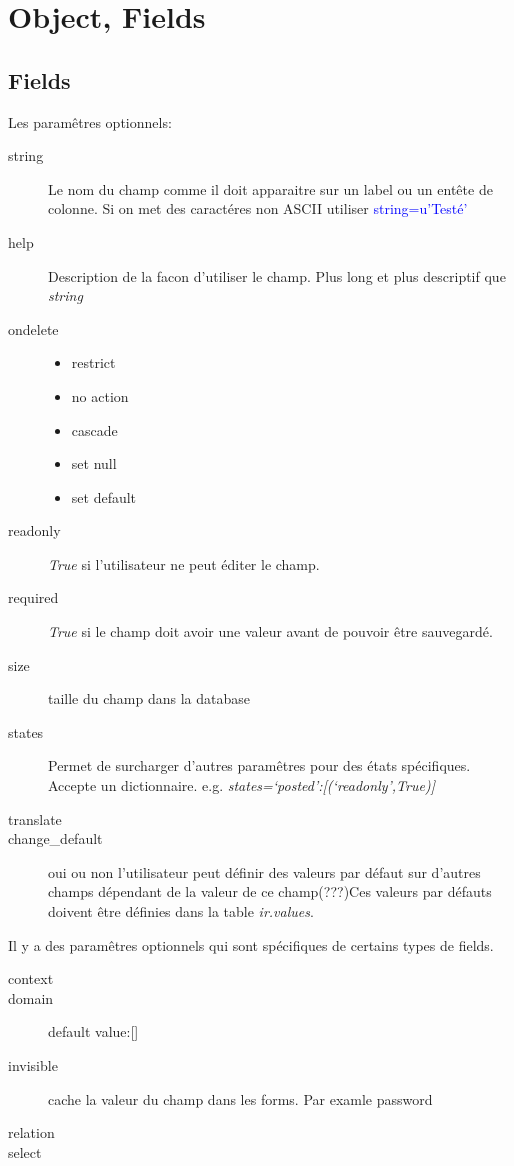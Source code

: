 \documentclass[12pt,a4paper]{article}
\begin{document}
\section{Object, Fields}
\label{sec:obj,field}

\subsection{Fields}
\label{sec:fields}

Les paramêtres optionnels:
\begin{description}

\item [string] Le nom du champ comme il doit apparaitre sur un label ou un entête de colonne. Si on met des caractéres non ASCII utiliser \textcolor{blue}{string=u'Testé'}
\item[help] Description de la facon d'utiliser le champ. Plus long et plus descriptif que \textsl{string}
\item[ondelete]
  \begin{itemize}
  \item restrict
  \item no action
  \item cascade
  \item set null
  \item set default
  \end{itemize}
\item[readonly] \textsl{True} si l'utilisateur ne peut éditer le champ.
\item[required] \textsl{True} si le champ doit avoir une valeur avant de pouvoir être sauvegardé.
\item[size] taille du champ dans la database
\item[states] Permet de surcharger d'autres paramêtres pour des états spécifiques. Accepte un dictionnaire. e.g. \textit{states={‘posted’:[(‘readonly’,True)]}}
\item[translate]
\item[change\_default] oui ou non l'utilisateur peut définir des valeurs par défaut sur d'autres champs dépendant de la valeur de ce champ(???)Ces valeurs par défauts doivent être définies dans la table \textsl{ir.values}.
\end{description}
Il y a des paramêtres optionnels qui sont spécifiques de certains types de fields.
\begin{description}
\item[context]
\item[domain] default value:[]
\item[invisible] cache la valeur du champ dans les forms. Par examle password
\item[relation]
\item[select] 
\end{description}
\end{document}
